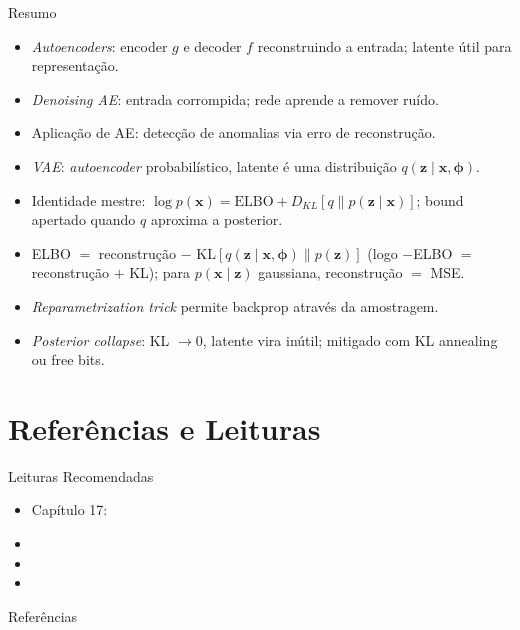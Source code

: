 \documentclass[aspectratio=169,xcolor=dvipsnames]{beamer}
\begin{document}
  \begin{frame}{Resumo}
    \begin{itemize}
      \item \textit{Autoencoders}: encoder $g$ e decoder $f$
      reconstruindo a entrada; latente útil para representação.
      \item \textit{Denoising AE}: entrada corrompida; rede aprende a
      remover ruído.
      \item Aplicação de AE: detecção de anomalias via erro de
      reconstrução.
      \item \textit{VAE}: \textit{autoencoder} probabilístico, latente
      é uma distribuição $q(\mathbf{z}\mid \mathbf{x},\bm{\phi})$.
      \item Identidade mestre:
      $\log p(\mathbf{x}) = \mathrm{ELBO} + D_{KL}[q\|p(\mathbf{z}\mid \mathbf{x})]$; bound
      apertado quando $q$ aproxima a posterior.
      \item ELBO $=$ reconstrução $-$ KL$[q(\mathbf{z}\mid \mathbf{x},\bm{\phi})\|p(\mathbf{z})]$
      (logo $-$ELBO $=$ reconstrução $+$ KL);
      para $p(\mathbf{x}\mid \mathbf{z})$ gaussiana, reconstrução $=$ MSE.
      \item \textit{Reparametrization trick} permite backprop através
      da amostragem.
      \item \textit{Posterior collapse}: KL $\to 0$, latente vira
      inútil; mitigado com KL annealing ou free bits.
    \end{itemize}
  \end{frame}

  \section*{Referências e Leituras}

  \begin{frame}{Leituras Recomendadas}
    \leiturasize
    \begin{itemize}
      \item Capítulo 17: 
      \item {}
      \item {}
      \item {}
    \end{itemize}
  \end{frame}

  \begin{frame}[allowframebreaks]{Referências}
    \sloppy
    \printbibliography[heading=none]
  \end{frame}
\end{document}
